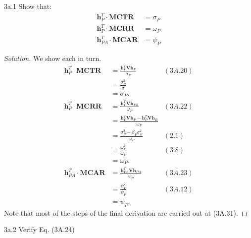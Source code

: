 
\begin{problem}{3a.1}
Show that:
\begin{align*}
\mathbf{h}^{T}_{P} \cdot \mathbf{MCTR} &= \sigma_{P}\\
\mathbf{h}^{T}_{P} \cdot \mathbf{MCRR} &= \omega_{P}\\
\mathbf{h}^{T}_{PA} \cdot \mathbf{MCAR} &= \psi_{P}
\end{align*}
\end{problem}

\begin{proof}[Solution]
We show each in turn.
\begin{align*}
\mathbf{h}^{T}_{P} \cdot \mathbf{MCTR} &= \frac{\mathbf{h}_{P}^{T}\mathbf{V}\mathbf{h}_{P}}{\sigma_{P}} & (3A.20)\\
&= \frac{\sigma_{P}^{2}}{\sigma}\\
&= \sigma_{P}.\\
\mathbf{h}_{P}^{T} \cdot \mathbf{MCRR} &= \frac{\mathbf{h}_{P}^{T}\mathbf{V}\mathbf{h}_{PR}}{\omega_{P}} & (3A.22)\\
&= \frac{\mathbf{h}_{P}^{T}\mathbf{V}\mathbf{h}_{P} - \mathbf{h}_{P}^{T}\mathbf{V}\mathbf{h}_{B}}{\omega_{P}} \\
&= \frac{\sigma_{P}^{2} - \beta_{P}\sigma_{B}^{2}}{\omega_{P}} &(2.1)\\
&= \frac{\omega_{P}^{2}}{\omega_{P}} & (3.8)\\
&= \omega_{P}.\\
\mathbf{h}_{PA}^{T} \cdot \mathbf{MCAR} &= \frac{\mathbf{h}_{PA}^{T}\mathbf{V}\mathbf{h}_{PA}}{\psi_{P}} & (3A.23)\\
&= \frac{\psi_{P}^{2}}{\psi_{P}} & (3A.12)\\
&= \psi_{P}.
\end{align*}
Note that most of the steps of the final derivation are carried out at (3A.31).
\end{proof}


\begin{problem}{3a.2}
Verify Eq. (3A.24)
\end{problem}

